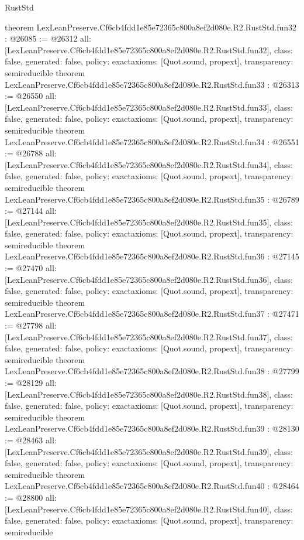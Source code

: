 \begin{lexlean}{RustStd}
\begin{coremodule}
{}
theorem LexLeanPreserve.Cf6cb4fdd1e85e72365c800a8ef2d080e.R2.RustStd.fun32 : @26085 := @26312 {
  all: [LexLeanPreserve.Cf6cb4fdd1e85e72365c800a8ef2d080e.R2.RustStd.fun32],
  class: false,
  generated: false,
  policy: exact{axioms: [Quot.sound, propext]},
  transparency: semireducible
}
theorem LexLeanPreserve.Cf6cb4fdd1e85e72365c800a8ef2d080e.R2.RustStd.fun33 : @26313 := @26550 {
  all: [LexLeanPreserve.Cf6cb4fdd1e85e72365c800a8ef2d080e.R2.RustStd.fun33],
  class: false,
  generated: false,
  policy: exact{axioms: [Quot.sound, propext]},
  transparency: semireducible
}
theorem LexLeanPreserve.Cf6cb4fdd1e85e72365c800a8ef2d080e.R2.RustStd.fun34 : @26551 := @26788 {
  all: [LexLeanPreserve.Cf6cb4fdd1e85e72365c800a8ef2d080e.R2.RustStd.fun34],
  class: false,
  generated: false,
  policy: exact{axioms: [Quot.sound, propext]},
  transparency: semireducible
}
theorem LexLeanPreserve.Cf6cb4fdd1e85e72365c800a8ef2d080e.R2.RustStd.fun35 : @26789 := @27144 {
  all: [LexLeanPreserve.Cf6cb4fdd1e85e72365c800a8ef2d080e.R2.RustStd.fun35],
  class: false,
  generated: false,
  policy: exact{axioms: [Quot.sound, propext]},
  transparency: semireducible
}
theorem LexLeanPreserve.Cf6cb4fdd1e85e72365c800a8ef2d080e.R2.RustStd.fun36 : @27145 := @27470 {
  all: [LexLeanPreserve.Cf6cb4fdd1e85e72365c800a8ef2d080e.R2.RustStd.fun36],
  class: false,
  generated: false,
  policy: exact{axioms: [Quot.sound, propext]},
  transparency: semireducible
}
theorem LexLeanPreserve.Cf6cb4fdd1e85e72365c800a8ef2d080e.R2.RustStd.fun37 : @27471 := @27798 {
  all: [LexLeanPreserve.Cf6cb4fdd1e85e72365c800a8ef2d080e.R2.RustStd.fun37],
  class: false,
  generated: false,
  policy: exact{axioms: [Quot.sound, propext]},
  transparency: semireducible
}
theorem LexLeanPreserve.Cf6cb4fdd1e85e72365c800a8ef2d080e.R2.RustStd.fun38 : @27799 := @28129 {
  all: [LexLeanPreserve.Cf6cb4fdd1e85e72365c800a8ef2d080e.R2.RustStd.fun38],
  class: false,
  generated: false,
  policy: exact{axioms: [Quot.sound, propext]},
  transparency: semireducible
}
theorem LexLeanPreserve.Cf6cb4fdd1e85e72365c800a8ef2d080e.R2.RustStd.fun39 : @28130 := @28463 {
  all: [LexLeanPreserve.Cf6cb4fdd1e85e72365c800a8ef2d080e.R2.RustStd.fun39],
  class: false,
  generated: false,
  policy: exact{axioms: [Quot.sound, propext]},
  transparency: semireducible
}
theorem LexLeanPreserve.Cf6cb4fdd1e85e72365c800a8ef2d080e.R2.RustStd.fun40 : @28464 := @28800 {
  all: [LexLeanPreserve.Cf6cb4fdd1e85e72365c800a8ef2d080e.R2.RustStd.fun40],
  class: false,
  generated: false,
  policy: exact{axioms: [Quot.sound, propext]},
  transparency: semireducible
}
\end{coremodule}
\end{lexlean}
